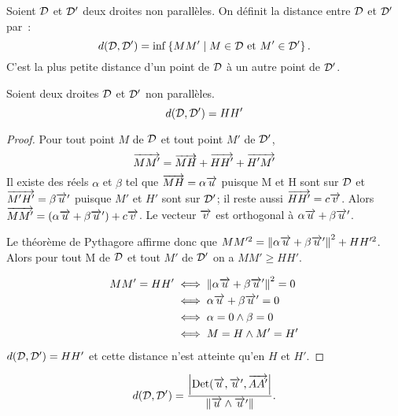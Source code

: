 \begin{defdef}
  Soient \(\mathcal{D}\) et \(\mathcal{D}'\) deux droites non parallèles. On définit la
  distance entre \(\mathcal{D}\) et \(\mathcal{D}'\) par~:
  \begin{equation}
    d(\mathcal{D}, \mathcal{D}') = \inf\left\{MM'\mathrel{}\middle|\mathrel{}M \in \mathcal{D} \text{~et~} M'\in \mathcal{D}'\right\}.
  \end{equation}
  C'est la plus petite distance d'un point de \(\mathcal{D}\) à un autre point de
  \(\mathcal{D}'\).
\end{defdef}

\begin{prop}
  Soient deux droites \(\mathcal{D}\) et \(\mathcal{D}'\) non parallèles.
  \begin{equation}
    d(\mathcal{D}, \mathcal{D}') = HH'
  \end{equation}
\end{prop}

\begin{proof}
  Pour tout point \(M\) de \(\mathcal{D}\) et tout point \(M'\) de \(\mathcal{D}'\),
  \begin{equation}
    \overrightarrow{MM'} = \overrightarrow{MH} + \overrightarrow{HH'} + \overrightarrow{H'M'}
  \end{equation}
  Il existe des réels \(\alpha\) et \(\beta\) tel que \(\overrightarrow{MH} =
  \alpha\overrightarrow{u}\) puisque M et H sont sur \(\mathcal{D}\) et \(\overrightarrow{M'H'} = \beta\overrightarrow{u}'\)
  puisque \(M'\) et \(H'\) sont sur \(\mathcal{D}'\); il reste aussi \(\overrightarrow{HH'} =
  c\overrightarrow{v}\). Alors \(\overrightarrow{MM'} = (\alpha\overrightarrow{u} + \beta\overrightarrow{u}') + c\overrightarrow{v}\). Le vecteur
  \(\overrightarrow{v}\) est orthogonal à \(\alpha\overrightarrow{u} + \beta\overrightarrow{u}'\).

  Le théorème de Pythagore affirme donc que \(MM'^2 = \left\lVert\alpha\overrightarrow{u} +
  \beta\overrightarrow{u}'\right\rVert^2 + HH'^2\). Alors pour tout M de \(\mathcal{D}\) et tout \(M'\) de
  \(\mathcal{D}'\) on a \(MM'\geqslant HH'\).

  \begin{align}
    MM' = HH' &\iff \left\lVert\alpha\overrightarrow{u} + \beta\overrightarrow{u}'\right\rVert^2 = 0\\
              &\iff \alpha\overrightarrow{u} + \beta\overrightarrow{u}' = 0\\
              &\iff \alpha = 0 \wedge \beta = 0\\
              &\iff M = H \wedge M' = H'
  \end{align}
  \(d(\mathcal{D}, \mathcal{D}') = HH'\) et cette distance n'est atteinte qu'en \(H\) et
  \(H'\).
\end{proof}

\begin{prop}
  \begin{equation}
    d(\mathcal{D}, \mathcal{D}') = \frac{\left\lvert\operatorname{Det}(\overrightarrow{u}, \overrightarrow{u}',
    \overrightarrow{AA'}\right\rvert}{\left\lVert\overrightarrow{u}\wedge\overrightarrow{u}'\right\rVert}.
  \end{equation}
\end{prop}

